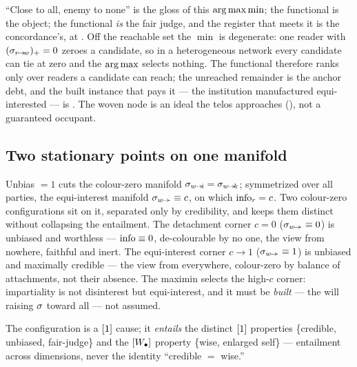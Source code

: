 \documentclass[../main]{subfiles}
\begin{document}
``Close to all, enemy to none'' is the gloss of this $\operatorname*{arg\,max}\min$; the functional is the
object; the functional \emph{is} the fair judge, and the register that meets it is the
concordance's, at . Off the reachable set the $\min$ is degenerate: one
reader with $(\sigma\sb{ r\!\to\!w })_{+}=0$ zeroes a candidate, so in a heterogeneous network every
candidate can tie at zero and the $\operatorname*{arg\,max}$ selects nothing. The functional therefore
ranks only over readers a candidate can reach; the unreached remainder is the anchor
debt, and the built instance that pays it --- the institution manufactured equi-interested
--- is . The woven node is an ideal the telos approaches
(), not a guaranteed occupant.

\subsection{Two stationary points on one manifold}
\label{subsec:wit:manifold}
%
\begin{insight}
  Unbias $=1$ cuts the colour-zero manifold $\sigma\sb{ w\!\to\!i }=\sigma\sb{ w\!\to\!k }$; symmetrized over all
  parties, the equi-interest manifold $\sigma\sb{ w\!\to\!\cdot }\equiv c$, on which $\operatorname{info}_r=c$. Two
  colour-zero configurations sit on it, separated only by credibility, and  keeps
  them distinct without collapsing the entailment. The detachment corner $c=0$
  ($\sigma\sb{ w\!\to\!\cdot }\equiv0$) is unbiased and worthless --- $\operatorname{info}\equiv0$, de-colourable
  by no one, the view from nowhere, faithful and inert. The equi-interest corner $c\to1$
  ($\sigma\sb{ w\!\to\!\cdot }\equiv1$) is unbiased and maximally credible --- the view from
  everywhere, colour-zero by balance of attachments, not their absence. The maximin selects
  the high-$c$ corner: impartiality is not disinterest but equi-interest, and it must be
  \emph{built} --- the will raising $\sigma$ toward all --- not assumed.
\end{insight}

The configuration is a $[1]$ cause; it \emph{entails} the distinct $[1]$
properties \{credible, unbiased, fair-judge\} and the $[W\sb{\bullet}]$ property \{wise, enlarged
self\} --- entailment across dimensions, never the identity ``credible $=$ wise.''

\end{document}

